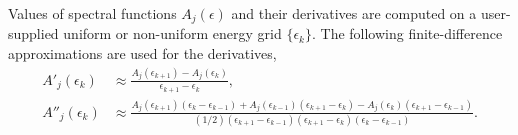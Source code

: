 \documentclass[]{article}
\begin{document}
Values of spectral functions $A_j(\epsilon)$ and their derivatives are computed on a user-supplied uniform or non-uniform energy grid $\{\epsilon_k\}$. The following finite-difference approximations are used for the derivatives,
\begin{align}
    A'_j(\epsilon_k) &\approx
        \frac{A_j(\epsilon_{k+1}) - A_j(\epsilon_k)}{\epsilon_{k+1} - \epsilon_k},\\
    A''_j(\epsilon_k) &\approx
        \frac{A_j(\epsilon_{k+1})(\epsilon_k - \epsilon_{k-1}) +
              A_j(\epsilon_{k-1})(\epsilon_{k+1} - \epsilon_{k}) -
              A_j(\epsilon_{k})(\epsilon_{k+1} - \epsilon_{k-1})}
             {(1/2)(\epsilon_{k+1} - \epsilon_{k-1})
                   (\epsilon_{k+1} - \epsilon_{k})
                   (\epsilon_{k} - \epsilon_{k-1})}.
\end{align}
\end{document}
